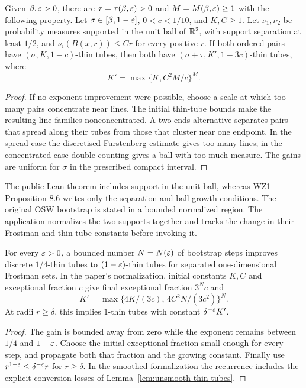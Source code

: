 \begin{proposition}
\label{prop:radial-bootstrap}
\leanok
{}
Given $\beta,\varepsilon>0$, there are $\tau=\tau(\beta,\varepsilon)>0$
and $M=M(\beta,\varepsilon)\geq1$ with the following property.
Let $\sigma\in[\beta,1-\varepsilon]$, $0<c<1/10$, and $K,C\geq1$.
Let $\nu_1,\nu_2$ be probability measures supported in the unit
ball of $\mathbb{R}^2$, with support separation at least $1/2$, and
$\nu_i(B(x,r))\leq Cr$ for every positive $r$.
If both ordered pairs have $(\sigma,K,1-c)$-thin tubes, then both
have $(\sigma+\tau,K',1-3c)$-thin tubes, where
\[
                     K'=\max\{K,C^2M/c\}^{M}.
\]
\end{proposition}
\begin{proof}
\leanok
If no exponent improvement were possible, choose a scale at which
too many pairs concentrate near lines. The initial thin-tube bounds
make the resulting line families nonconcentrated. A two-ends
alternative separates pairs that spread along their tubes from those
that cluster near one endpoint. In the spread case the discretised
Furstenberg estimate gives too many lines; in the concentrated case
double counting gives a ball with too much measure. The gains are
uniform for $\sigma$ in the prescribed compact interval.
\end{proof}

\begin{remark}
\label{rem:radial-support}
The public Lean theorem includes support in the unit ball, whereas
WZ1 Proposition 8.6 writes only the separation and ball-growth
conditions. The original OSW bootstrap is stated in a bounded
normalized region. The application normalizes the two supports
together and tracks the change in their Frostman and thin-tube
constants before invoking it.
\end{remark}

\begin{corollary}
\label{cor:thin-tube-iteration}
For every $\varepsilon>0$, a bounded number $N=N(\varepsilon)$ of bootstrap
steps improves discrete $1/4$-thin tubes to $(1-\varepsilon)$-thin tubes
for separated one-dimensional Frostman sets. In the paper's
normalization, initial constants $K,C$ and exceptional fraction $c$
give final exceptional fraction $3^Nc$ and
\[
       K'=\max\{4K/(3c),\,4C^2N/(3c^2)\}^{N}.
\]
At radii $r\geq\delta$, this implies $1$-thin tubes with
constant $\delta^{-\varepsilon}K'$.
\end{corollary}
\begin{proof}
The gain is bounded away from zero while the exponent remains
between $1/4$ and $1-\varepsilon$. Choose the initial exceptional fraction
small enough for every step, and propagate both that fraction and
the growing constant. Finally use
$r^{1-\varepsilon}\leq\delta^{-\varepsilon}r$ for $r\geq\delta$.
In the smoothed formalization the recurrence includes the explicit
conversion losses of Lemma~\ref{lem:unsmooth-thin-tubes}.
\end{proof}

